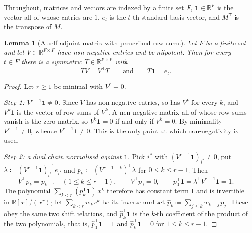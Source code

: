 \documentclass[11pt,a4paper]{article}
\theoremstyle{plain}
\newtheorem{lemma}[theorem]{Lemma}
\theoremstyle{definition}
\theoremstyle{remark}
\newcommand{\R}{\mathbb{R}}
\newcommand{\one}{\mathbf{1}}
\begin{document}
Throughout, matrices and vectors are indexed by a finite set $F$, $\one \in \R^F$
is the vector all of whose entries are $1$, $e_t$ is the $t$-th standard basis
vector, and $M^{\mathsf T}$ is the transpose of $M$.

\begin{lemma}[A self-adjoint matrix with prescribed row sums]
  \label{lem:selfadjoint}
  Let $F$ be a finite set and let $V \in \R^{F \times F}$ have non-negative
  entries and be nilpotent.  Then for every $t \in F$ there is a symmetric
  $T \in \R^{F \times F}$ with
  \[
    T V = V^{\mathsf T} T
    \qquad \text{and} \qquad
    T \one = e_t .
  \]
\end{lemma}

\begin{proof}
  Let $r \geq 1$ be minimal with $V^r = 0$.

  \emph{Step 1: $V^{r-1}\one \neq 0$.}  Since $V$ has non-negative entries, so
  has $V^k$ for every $k$, and $V^k \one$ is the vector of row sums of $V^k$.  A
  non-negative matrix all of whose row sums vanish is the zero matrix, so
  $V^k \one = 0$ if and only if $V^k = 0$.  By minimality $V^{r-1} \neq 0$,
  whence $V^{r-1}\one \neq 0$.  This is the only point at which non-negativity
  is used.

  \emph{Step 2: a dual chain normalised against $\one$.}  Pick $i^*$ with
  $(V^{r-1}\one)_{i^*} \neq 0$, put
  $\lambda \coloneqq (V^{r-1}\one)_{i^*}^{-1} e_{i^*}$ and
  $p_k \coloneqq (V^{r-1-k})^{\mathsf T}\lambda$ for $0 \leq k \leq r-1$.  Then
  \[
    V^{\mathsf T} p_k = p_{k-1} \quad (1 \leq k \leq r-1),
    \qquad
    V^{\mathsf T} p_0 = 0 ,
    \qquad
    p_0^{\mathsf T}\one = \lambda^{\mathsf T} V^{r-1} \one = 1 .
  \]
  The polynomial $\sum_{k<r} (p_k^{\mathsf T}\one)\,x^k$ therefore has constant
  term $1$ and is invertible in $\R[x]/(x^r)$; let $\sum_{k<r} w_k x^k$ be its
  inverse and set $\hat p_k \coloneqq \sum_{j \leq k} w_{k-j}\, p_j$.  These obey
  the same two shift relations, and $\hat p_k^{\mathsf T}\one$ is the $k$-th
  coefficient of the product of the two polynomials, that is,
  $\hat p_0^{\mathsf T}\one = 1$ and $\hat p_k^{\mathsf T}\one = 0$ for
  $1 \leq k \leq r-1$.


\end{proof}
\end{document}
